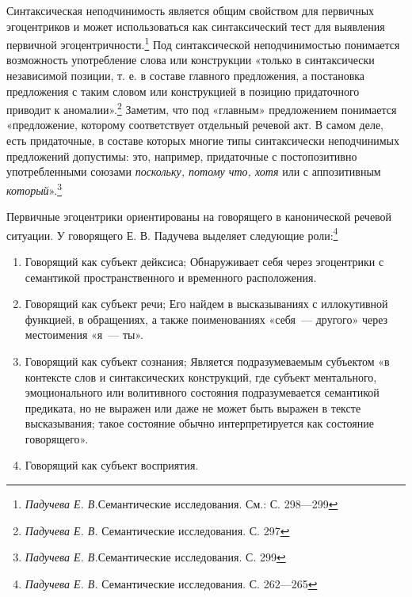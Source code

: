 \documentclass{kursa4}
\begin{document}
      Синтаксическая неподчинимость является общим свойством для первичных эгоцентриков и может использоваться как синтаксический тест для выявления первичной эгоцентричности.\footnote{\textit{Падучева Е. В.}Семантические исследования. См.: С. 298—299} Под синтаксической неподчинимостью понимается возможность употребление слова или конструкции «только в синтаксически независимой позиции, т. е. в составе главного предложения, а постановка предложения с таким словом или конструкцией в позицию придаточного приводит к аномалии».\footnote{\textit{ Падучева Е. В. }Семантические исследования. С. 297} Заметим, что под «главным» предложением понимается «предложение, которому соответствует отдельный речевой акт. В самом деле, есть придаточные, в составе которых многие типы синтаксически неподчинимых предложений допустимы: это, например, придаточные с постопозитивно употребленными союзами \textit{поскольку, потому что, хотя} или с аппозитивным \textit{который}».\footnote{\textit{Падучева Е. В.}Семантические исследования. С. 299}

      Первичные эгоцентрики ориентированы на говорящего в канонической речевой ситуации. У говорящего Е. В. Падучева выделяет следующие роли:\footnote{\textit{Падучева Е. В.} Семантические исследования. С. 262—265}

      \begin{enumerate}

        \item Говорящий как субъект дейксиса; \newline
        Обнаруживает себя через эгоцентрики с семантикой пространственного и временного расположения. 

        \item Говорящий как субъект речи; \newline
        Его найдем в высказываниях с иллокутивной функцией, в обращениях, а также поименованиях «себя~--- другого» через местоимения «я~--- ты». \item Говорящий как субъект сознания; \newline
        Является подразумеваемым субъектом «в контексте слов и синтаксических конструкций, где субъект ментального, эмоционального или волитивного состояния подразумевается семантикой предиката, но не выражен или даже не может быть выражен в тексте высказывания; такое состояние обычно интерпретируется как состояние говорящего». 

        \item Говорящий как субъект восприятия. \end{enumerate}
\end{document}
